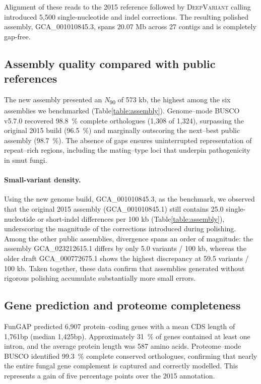 \documentclass[Journal,letterpaper]{ascelike-new}
\begin{document}
Alignment of these reads to the 2015 reference followed by
\textsc{DeepVariant} calling introduced 5,500 single-nucleotide and
indel corrections. The resulting polished assembly, GCA\_001010845.3,
spans 20.07 Mb across 27 contigs and is completely gap-free.

\subsection*{Assembly quality compared with public references}

The new assembly presented an \textit{N}\textsubscript{90} of 573 kb,
the highest among the six assemblies we benchmarked
(Table\ref{table:assembly}). Genome--mode BUSCO v5.7.0 recovered
98.8~\% complete orthologues (1,308 of 1,324), surpassing the
original 2015 build (96.5~\%) and marginally outscoring the
next--best public assembly (98.7~\%). The absence of gaps ensures
uninterrupted representation of repeat--rich regions, including the
mating--type loci that underpin pathogenicity in smut fungi.

\paragraph{Small-variant density.}
Using the new genome build, GCA\_001010845.3, as the benchmark, we
observed that the original 2015 assembly (GCA\_001010845.1) still
contains 25.0 single-nucleotide or short-indel differences per 100 kb
(Table\ref{table:assembly}), underscoring the magnitude of the
corrections introduced during polishing.  Among the other public
assemblies, divergence spans an order of magnitude: the assembly
GCA\_023212615.1 differs by only 5.0 variants / 100 kb, whereas the
older draft GCA\_000772675.1 shows the highest discrepancy at 59.5
variants / 100 kb.  Taken together, these data confirm that
assemblies generated without rigorous polishing accumulate
substantially more small errors.

\subsection*{Gene prediction and proteome completeness}

FunGAP predicted 6,907 protein--coding genes with a mean CDS length
of 1,761bp (median 1,425bp). Approximately 31~\% of genes contained
at least one intron, and the average protein length was 587 amino
acids. Proteome--mode BUSCO identified 99.3~\% complete conserved
orthologues, confirming that nearly the entire fungal gene complement
is captured and correctly modelled. This represents a gain of five
percentage points over the 2015 annotation.
\end{document}
